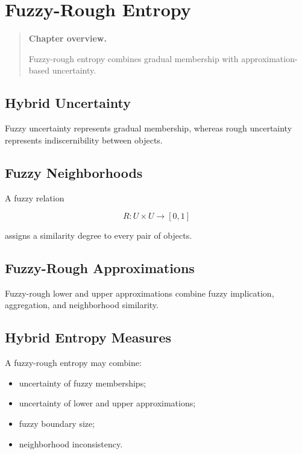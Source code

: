 \documentclass[11pt,oneside]{book}
\theoremstyle{remark}
\newenvironment{chapteroverview}
{
	\begin{quote}
		\small
		\textbf{Chapter overview.}
	}
	{
	\end{quote}
}
\begin{document}
	
	\chapter{Fuzzy-Rough Entropy}
	\label{chap:fuzzy-rough-entropy}
	
	\begin{chapteroverview}
		Fuzzy-rough entropy combines gradual membership with approximation-based
		uncertainty.
	\end{chapteroverview}
	
	\section{Hybrid Uncertainty}
	
	Fuzzy uncertainty represents gradual membership, whereas rough uncertainty
	represents indiscernibility between objects.
	
	\section{Fuzzy Neighborhoods}
	
	A fuzzy relation
	
	\[
	R:U\times U\rightarrow[0,1]
	\]
	
	assigns a similarity degree to every pair of objects.
	
	\section{Fuzzy-Rough Approximations}
	
	Fuzzy-rough lower and upper approximations combine fuzzy implication,
	aggregation, and neighborhood similarity.
	
	\section{Hybrid Entropy Measures}
	
	A fuzzy-rough entropy may combine:
	
	\begin{itemize}
		\item uncertainty of fuzzy memberships;
		\item uncertainty of lower and upper approximations;
		\item fuzzy boundary size;
		\item neighborhood inconsistency.
	\end{itemize}
	
\end{document}
